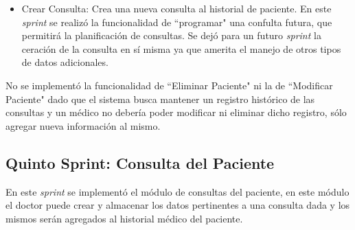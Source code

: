 \begin{enumerate}
\begin{itemize}
\begin{itemize}
                \item Crear Consulta: Crea una nueva consulta al historial de paciente. En este \textit{sprint} se realizó la funcionalidad de ``programar" una confulta futura, que permitirá la planificación de consultas. Se dejó para un futuro \textit{sprint} la ceración de la consulta en sí misma ya que amerita el manejo de otros tipos de datos adicionales.
            \end{itemize}           
            
            
            No se implementó la funcionalidad de ``Eliminar Paciente" ni la de ``Modificar Paciente" dado que el sistema busca mantener un registro histórico de las consultas y un médico no debería poder modificar ni eliminar dicho registro, sólo agregar nueva información al mismo.
            
        \end{itemize}
        

        
    \end{enumerate}
        
        
    \subsection{Quinto Sprint: Consulta del Paciente}
    
    En este \textit{sprint} se implementó el módulo de consultas del paciente, en este módulo el doctor puede crear y almacenar los datos pertinentes a una consulta dada y los mismos serán agregados al historial médico del paciente.
    
